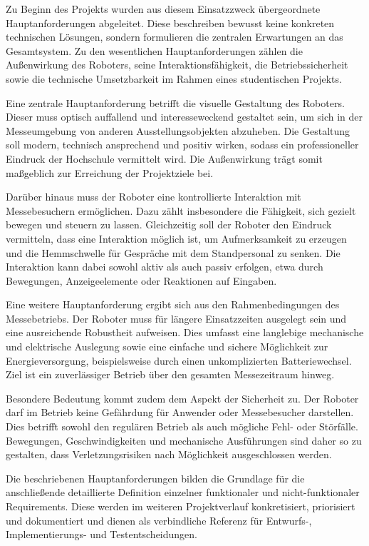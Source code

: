 Zu Beginn des Projekts wurden aus diesem Einsatzzweck übergeordnete Hauptanforderungen abgeleitet. Diese beschreiben bewusst keine konkreten technischen Lösungen, sondern formulieren die zentralen Erwartungen an das Gesamtsystem. Zu den wesentlichen Hauptanforderungen zählen die Außenwirkung des Roboters, seine Interaktionsfähigkeit, die Betriebssicherheit sowie die technische Umsetzbarkeit im Rahmen eines studentischen Projekts.

Eine zentrale Hauptanforderung betrifft die visuelle Gestaltung des Roboters. Dieser muss optisch auffallend und interesseweckend gestaltet sein, um sich in der Messeumgebung von anderen Ausstellungsobjekten abzuheben. Die Gestaltung soll modern, technisch ansprechend und positiv wirken, sodass ein professioneller Eindruck der Hochschule vermittelt wird. Die Außenwirkung trägt somit maßgeblich zur Erreichung der Projektziele bei.

Darüber hinaus muss der Roboter eine kontrollierte Interaktion mit Messebesuchern ermöglichen. Dazu zählt insbesondere die Fähigkeit, sich gezielt bewegen und steuern zu lassen. Gleichzeitig soll der Roboter den Eindruck vermitteln, dass eine Interaktion möglich ist, um Aufmerksamkeit zu erzeugen und die Hemmschwelle für Gespräche mit dem Standpersonal zu senken. Die Interaktion kann dabei sowohl aktiv als auch passiv erfolgen, etwa durch Bewegungen, Anzeigeelemente oder Reaktionen auf Eingaben.

Eine weitere Hauptanforderung ergibt sich aus den Rahmenbedingungen des Messebetriebs. Der Roboter muss für längere Einsatzzeiten ausgelegt sein und eine ausreichende Robustheit aufweisen. Dies umfasst eine langlebige mechanische und elektrische Auslegung sowie eine einfache und sichere Möglichkeit zur Energieversorgung, beispielsweise durch einen unkomplizierten Batteriewechsel. Ziel ist ein zuverlässiger Betrieb über den gesamten Messezeitraum hinweg.

Besondere Bedeutung kommt zudem dem Aspekt der Sicherheit zu. Der Roboter darf im Betrieb keine Gefährdung für Anwender oder Messebesucher darstellen. Dies betrifft sowohl den regulären Betrieb als auch mögliche Fehl- oder Störfälle. Bewegungen, Geschwindigkeiten und mechanische Ausführungen sind daher so zu gestalten, dass Verletzungsrisiken nach Möglichkeit ausgeschlossen werden.

Die beschriebenen Hauptanforderungen bilden die Grundlage für die anschließende detaillierte Definition einzelner funktionaler und nicht-funktionaler Requirements. Diese werden im weiteren Projektverlauf konkretisiert, priorisiert und dokumentiert und dienen als verbindliche Referenz für Entwurfs-, Implementierungs- und Testentscheidungen.
 
